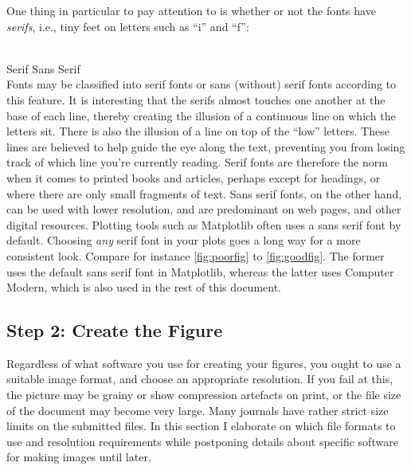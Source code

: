 \documentclass[a4paper,twocolumn]{article}
\begin{document}
One thing in particular to pay attention to is whether or not the fonts have \emph{serifs}, i.e., tiny feet on letters such as ``i'' and ``f'':
\\
~

{ \hfill {\Huge Serif} \hfill {\Huge \sf Sans Serif} \hfill }
\\

\noindent Fonts may be classified into serif fonts or sans (without) serif fonts according to this feature.
It is interesting that the serifs almost touches one another at the base of each line, thereby creating the illusion of a continuous line on which the letters sit.
There is also the illusion of a line on top of the ``low'' letters.
These lines are believed to help guide the eye along the text, preventing you from losing track of which line you're currently reading.
Serif fonts are therefore the norm when it comes to printed books and articles, perhaps except for headings, or where there are only small fragments of text.
Sans serif fonts, on the other hand, can be used with lower resolution, and are predominant on web pages, and other digital resources. Plotting tools such as Matplotlib often uses a sans serif font by default. Choosing \emph{any} serif font in your plots goes a long way for a more consistent look. Compare for instance \cref{fig:poorfig} to \cref{fig:goodfig}. The former uses the default sans serif font in Matplotlib, whereas the latter uses Computer Modern, which is also used in the rest of this document.

\subsection{Step 2: Create the Figure}
Regardless of what software you use for creating your figures, you ought to use a suitable image format, and choose an appropriate resolution. If you fail at this, the picture may be grainy or show compression artefacts on print, or the file size of the document may become very large. Many journals have rather strict size limits on the submitted files. In this section I elaborate on which file formats to use and resolution requirements while postponing details about specific software for making images until later.

\end{document}
